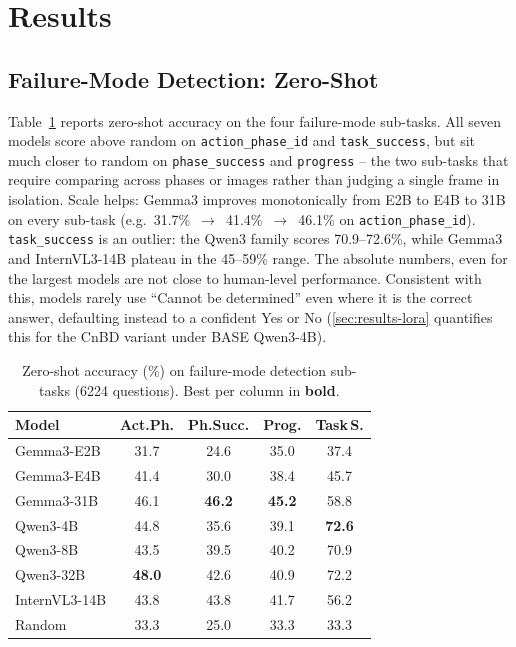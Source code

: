 \section{Results}
\label{sec:results}

\subsection{Failure-Mode Detection: Zero-Shot}
Table~\ref{tab:main_results} reports zero-shot accuracy on the four failure-mode sub-tasks. All seven models score above random on \texttt{action\_phase\_id} and \texttt{task\_success}, but sit much closer to random on \texttt{phase\_success} and \texttt{progress} -- the two sub-tasks that require comparing across phases or images rather than judging a single frame in isolation. Scale helps: Gemma3 improves monotonically from E2B to E4B to 31B on every sub-task
(e.g.\ 31.7\%~$\to$~41.4\%~$\to$~46.1\% on \texttt{action\_phase\_id}). \texttt{task\_success} is an outlier: the Qwen3 family scores 70.9--72.6\%, while Gemma3 and InternVL3-14B plateau in the 45--59\% range. The absolute
numbers, even for the largest models are not close to human-level performance. Consistent with this, models rarely use ``Cannot be determined'' even where it is the correct answer, defaulting instead to a confident Yes or No (\cref{sec:results-lora} quantifies this for the CnBD variant under BASE Qwen3-4B).

\begin{table}[t]
  \centering
  \caption{Zero-shot accuracy (\%) on failure-mode detection sub-tasks
  (6224 questions). Best per column in \textbf{bold}.}
  \label{tab:main_results}
  \setlength{\tabcolsep}{4pt}
  \begin{tabular}{l|cccc}
    \toprule
    \textbf{Model} & \textbf{Act.Ph.} & \textbf{Ph.Succ.} & \textbf{Prog.} & \textbf{Task\,S.} \\
    \midrule
    Gemma3-E2B    & 31.7          & 24.6          & 35.0          & 37.4          \\
    Gemma3-E4B    & 41.4          & 30.0          & 38.4          & 45.7          \\
    Gemma3-31B    & 46.1          & \textbf{46.2} & \textbf{45.2} & 58.8          \\
    \midrule
    Qwen3-4B      & 44.8          & 35.6          & 39.1          & \textbf{72.6} \\
    Qwen3-8B      & 43.5          & 39.5          & 40.2          & 70.9          \\
    Qwen3-32B     & \textbf{48.0} & 42.6          & 40.9          & 72.2          \\
    \midrule
    InternVL3-14B & 43.8          & 43.8          & 41.7          & 56.2          \\
    \midrule
    Random        & 33.3          & 25.0          & 33.3          & 33.3          \\
    \bottomrule
  \end{tabular}
\end{table}

